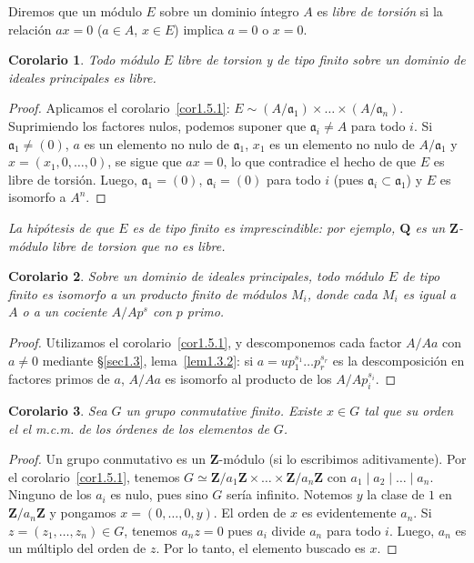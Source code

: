\documentclass[oneside,bibtotoc,leqno,spanish]{amsbook}
\newcommand{\QQ}{\mathbf{Q}}
\newcommand{\ZZ}{\mathbf{Z}}
\newcommand{\idl}[1]{\mathfrak{#1}}
\numberwithin{equation}{section}
\newenvironment{comm}%
	{\begin{trivlist}\item\small\itshape}
	{\end{trivlist}}
\theoremstyle{defi}
\theoremstyle{note}
\newtheorem{corollary}{Corolario}
\theoremstyle{rem}
\numberwithin{theorem}{section}
\numberwithin{proposition}{section}
\numberwithin{definition}{section}
\numberwithin{lemma}{section}
\numberwithin{corollary}{section}
\numberwithin{example}{section}
\numberwithin{footnote}{section}%
\begin{document}
Diremos que un m\'odulo $E$ sobre un dominio \'integro $A$ es
{\em libre de torsi\'on} si la relaci\'on $ax = 0$
($a\in A$, $x\in E$) implica $a = 0$ o $x = 0$.

\begin{corollary}
Todo m\'odulo $E$ libre de torsion y de tipo finito
sobre un dominio de ideales principales es libre.
\end{corollary}

\begin{proof}
Aplicamos el corolario~\ref{cor1.5.1}: $E \sim (A/\idl{a}_{1})\times\dots
\times (A/\idl{a}_{n})$. Suprimiendo los factores nulos, podemos
suponer que $\idl{a}_{i}\neq A$ para todo $i$. Si $\idl{a}_{1}\neq(0)$,
$a$ es un elemento no nulo de $\idl{a}_{1}$,
$x_{1}$ es un elemento no nulo de $A/\idl{a}_{1}$ y
$x = (x_{1},0,\dots,0)$, se sigue que $ax = 0$, lo que contradice
el hecho de que $E$ es libre de torsi\'on. Luego,
$\idl{a}_{1} = (0)$, $\idl{a}_{i} = (0)$ para todo $i$ (pues
$\idl{a}_{i}\subset\idl{a}_{1}$) y $E$ es isomorfo a $A^{n}$.
\end{proof}

\begin{comm}
La hip\'otesis de que $E$ es de tipo finito es imprescindible:
por ejemplo, $\QQ$ es un $\ZZ$-m\'odulo libre de torsion que no
es libre.
\end{comm}

\begin{corollary}
Sobre un dominio de ideales principales, todo m\'odulo $E$
de tipo finito es isomorfo a un producto finito de m\'odulos
$M_{i}$, donde cada $M_{i}$ es igual a $A$ o a un cociente
$A/Ap^{s}$ con $p$ primo.
\end{corollary}

\begin{proof}
Utilizamos el corolario~\ref{cor1.5.1}, y descomponemos cada factor
$A/Aa$ con $a\neq 0$ mediante \S\ref{sec1.3}, lema~\ref{lem1.3.2}: si
$a = up_{1}^{s_{1}}\dots p_{r}^{s_{r}}$ es la
descomposici\'on en factores primos de $a$, $A/Aa$ es
isomorfo al producto de los $A/Ap_{i}^{s_{i}}$.
\end{proof}

\begin{corollary}\label{cor1.5.4}
Sea $G$ un grupo conmutative finito. Existe $x\in G$ tal que
su orden el el m.c.m. de los \'ordenes de los elementos de $G$.
\end{corollary}

\begin{proof}
Un grupo conmutativo es un $\ZZ$-m\'odulo (si lo escribimos
aditivamente). Por el corolario~\ref{cor1.5.1}, tenemos $G \simeq
\ZZ/a_{1}\ZZ\times\dots\times\ZZ/a_{n}\ZZ$ con
$a_{1}\mid a_{2}\mid\dots\mid a_{n}$. Ninguno de los $a_{i}$
es nulo, pues sino $G$ ser\'ia infinito. Notemos $y$ la
clase de $1$ en $\ZZ/a_{n}\ZZ$ y pongamos $x = (0,\dots,0,y)$.
El orden de $x$ es evidentemente $a_{n}$. Si $z = (z_{1},\dots,z_{n})\in G$,
tenemos $a_{n}z = 0$ pues $a_{i}$ divide $a_{n}$ para todo $i$.
Luego, $a_{n}$ es un m\'ultiplo del orden de $z$. Por lo tanto, el
elemento buscado es $x$.
\end{proof}
\end{document}
